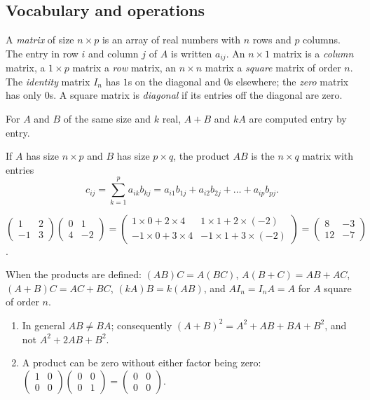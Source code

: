 \subsection{Vocabulary and operations}
\begin{definition}[Matrix]
A \emph{matrix} of size $n\times p$ is an array of real numbers with $n$ rows and $p$ columns. The entry in row $i$ and column $j$ of $A$ is written $a_{ij}$. An $n\times1$ matrix is a \emph{column} matrix, a $1\times p$ matrix a \emph{row} matrix, an $n\times n$ matrix a \emph{square} matrix of order $n$. The \emph{identity} matrix $I_n$ has $1$s on the diagonal and $0$s elsewhere; the \emph{zero} matrix has only $0$s. A square matrix is \emph{diagonal} if its entries off the diagonal are zero.
\end{definition}
\begin{definition}
For $A$ and $B$ of the same size and $k$ real, $A+B$ and $kA$ are computed entry by entry.\par
If $A$ has size $n\times p$ and $B$ has size $p\times q$, the product $AB$ is the $n\times q$ matrix with entries
\[c_{ij}=\sum_{k=1}^{p}a_{ik}b_{kj}=a_{i1}b_{1j}+a_{i2}b_{2j}+\dots+a_{ip}b_{pj}.\]
\end{definition}
\begin{example}[A product]
$\begin{pmatrix}1&2\\-1&3\end{pmatrix}\begin{pmatrix}0&1\\4&-2\end{pmatrix}=\begin{pmatrix}1\times0+2\times4&1\times1+2\times(-2)\\-1\times0+3\times4&-1\times1+3\times(-2)\end{pmatrix}=\begin{pmatrix}8&-3\\12&-7\end{pmatrix}$.
\end{example}
\begin{theorem}
When the products are defined: $(AB)C=A(BC)$, $A(B+C)=AB+AC$, $(A+B)C=AC+BC$, $(kA)B=k(AB)$, and $AI_n=I_nA=A$ for $A$ square of order $n$.
\end{theorem}
\begin{pitfall}
\begin{enumerate}
\item In general $AB\neq BA$; consequently $(A+B)^2=A^2+AB+BA+B^2$, and not $A^2+2AB+B^2$.
\item A product can be zero without either factor being zero: $\begin{pmatrix}1&0\\0&0\end{pmatrix}\begin{pmatrix}0&0\\0&1\end{pmatrix}=\begin{pmatrix}0&0\\0&0\end{pmatrix}$.
\end{enumerate}
\end{pitfall}


